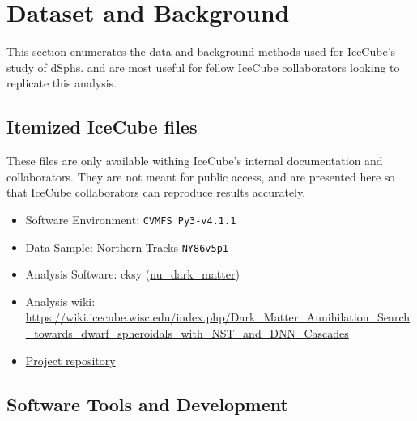 \section{Dataset and Background}\label{sec:icDM_databgd}

This section enumerates the data and background methods used for IceCube's study of dSphs.
 and  are most useful for fellow IceCube collaborators looking to replicate this analysis.

\subsection{Itemized IceCube files}\label{sec:icDM_data}

These files are only available withing IceCube's internal documentation and collaborators.
They are not meant for public access, and are presented here so that IceCube collaborators can reproduce results accurately.

\begin{itemize}
    \item Software Environment: \texttt{CVMFS Py3-v4.1.1}
    \item Data Sample: Northern Tracks \texttt{NY86v5p1}
    \item Analysis Software: cksy (\href{https://github.com/icecube/csky/tree/nu\_dark\_matter}{nu\_dark\_matter})
    \item Analysis wiki: \url{https://wiki.icecube.wisc.edu/index.php/Dark\_Matter\_Annihilation\_Search\_towards\_dwarf\_spheroidals\_with\_NST\_and\_DNN\_Cascades}
    \item \href{https://github.com/salaza82/IceCube_dark_matter_dsph}{Project repository}
\end{itemize}

\subsection{Software Tools and Development}\label{sec:icDM_tools}

